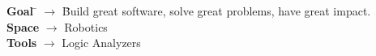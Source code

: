 

\begin{tabbing}

\textbf{Goal}
\quad \= $\rightarrow$ \quad \=
Build great software, solve great problems, have great impact.
\\

\textbf{Space}
\> $\rightarrow$ \>
Robotics
\\

\textbf{Tools}
\> $\rightarrow$ \>
Logic Analyzers

\end{tabbing}







